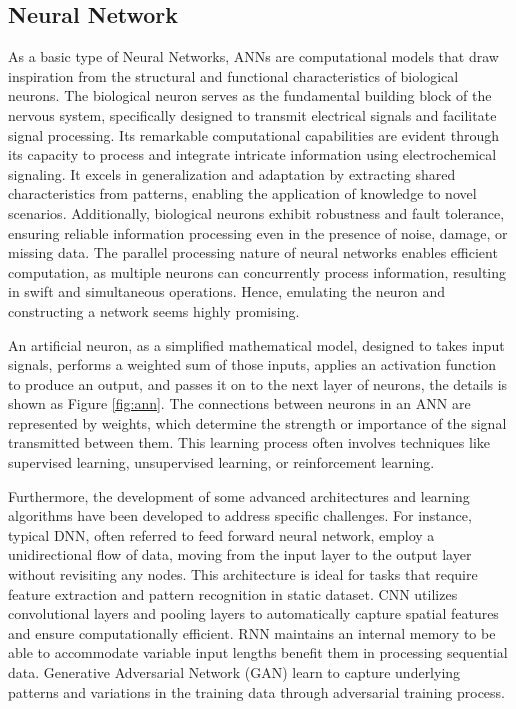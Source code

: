 \subsection{Neural Network}
As a basic type of Neural Networks, \ac{ANN}s are computational models that draw inspiration from the structural and functional characteristics of biological neurons\cite{zhangIntroductionArtificialNeural2000}. The biological neuron serves as the fundamental building block of the nervous system, specifically designed to transmit electrical signals and facilitate signal processing. Its remarkable computational capabilities are evident through its capacity to process and integrate intricate information using electrochemical signaling\cite{zouOverviewArtificialNeural2009}. It excels in generalization and adaptation by extracting shared characteristics from patterns, enabling the application of knowledge to novel scenarios. Additionally, biological neurons exhibit robustness and fault tolerance\cite{chenElectrochemicalMemristorBasedArtificialNeurons}, ensuring reliable information processing even in the presence of noise, damage, or missing data. The parallel processing nature of neural networks enables efficient computation\cite{hopfieldNeuralNetworksPhysical1982}, as multiple neurons can concurrently process information, resulting in swift and simultaneous operations. Hence, emulating the neuron and constructing a network seems highly promising. 

An artificial neuron, as a simplified mathematical model, designed to takes input signals, performs a weighted sum of those inputs, applies an activation function to produce an output, and passes it on to the next layer of neurons, the details is shown as Figure \ref{fig:ann}. The connections between neurons in an ANN are represented by weights, which determine the strength or importance of the signal transmitted between them. This learning process often involves techniques like supervised learning, unsupervised learning, or reinforcement learning. 


Furthermore, the development of some advanced architectures and learning algorithms have been developed to address specific challenges. For instance, typical \ac{DNN}, often referred to feed forward neural network, employ a unidirectional flow of data, moving from the input layer to the output layer without revisiting any nodes. This architecture is ideal for tasks that require feature extraction and pattern recognition in static dataset\cite{hwangboLearningAgileDynamic2019}. \ac{CNN} utilizes convolutional layers and pooling layers to automatically capture spatial features and ensure computationally efficient\cite{albawiUnderstandingConvolutionalNeural2017}. \ac{RNN} maintains an internal memory to be able to accommodate variable input lengths benefit them in processing sequential data\cite{liptonCriticalReviewRecurrent2015}. Generative Adversarial Network (GAN) learn to capture underlying patterns and variations in the training data through adversarial training process\cite{songEnergyConsumptionAuditing2023}.   

